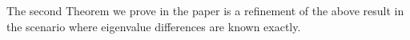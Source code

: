 \documentclass[11pt]{article}
\newtheorem{theorem}{Theorem}
\newcommand{\norm}[1]{\left|\left| #1 \right|\right|}
\newcommand{\EE}{\mathbb{E}}
\newcommand{\prob}[1]{{\rm Prob}\left[ #1 \right]}
\newcommand{\bigotilde}[1]{\widetilde{O} \left( #1 \right)}
\begin{document}
The second Theorem we prove in the paper is a refinement of the above result in the scenario where eigenvalue differences are known exactly.
\end{document}
